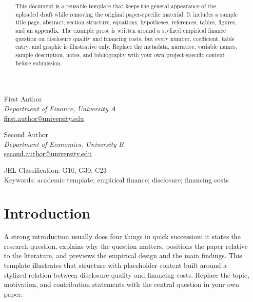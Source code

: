 \documentclass[hidelinks,12pt]{article}
\title{\bf \papertitle\\
\vspace*{-20pt}}
\author{}
\date{}
\makeatletter
\newcommand{\paperauthorone}{First Author}
\newcommand{\paperauthortwo}{Second Author}
\newcommand{\paperaffilone}{Department of Finance, University A}
\newcommand{\paperaffiltwo}{Department of Economics, University B}
\newcommand{\paperemailone}{first.author@university.edu}
\newcommand{\paperemailtwo}{second.author@university.edu}
\newif\ifblind
\makeatother
\begin{document}
\maketitle
\thispagestyle{empty}

\ifblind\else
\vspace{-1.5em}
\begin{center}
\paperauthorone\\
\textit{\paperaffilone}\\
\href{mailto:\paperemailone}{\paperemailone}
\vspace{0.7em}

\paperauthortwo\\
\textit{\paperaffiltwo}\\
\href{mailto:\paperemailtwo}{\paperemailtwo}
\end{center}
\vspace{1.0em}
\fi

\begin{abstract}
\vspace{0pt}
This document is a reusable template that keeps the general appearance of the uploaded draft while removing the original paper-specific material. It includes a sample title page, abstract, section structure, equations, hypotheses, references, tables, figures, and an appendix. The example prose is written around a stylized empirical finance question on disclosure quality and financing costs, but every number, coefficient, table entry, and graphic is illustrative only. Replace the metadata, narrative, variable names, sample description, notes, and bibliography with your own project-specific content before submission.
\end{abstract}


\vspace{32pt}
{\noindent JEL Classification: } G10, G30, C23\\
Keywords: academic template; empirical finance; disclosure; financing costs

\newpage
\setcounter{page}{1}

\section{Introduction}
\label{sec:intro}

A strong introduction usually does four things in quick succession: it states the research question, explains why the question matters, positions the paper relative to the literature, and previews the empirical design and the main findings. This template illustrates that structure with placeholder content built around a stylized relation between disclosure quality and financing costs. Replace the topic, motivation, and contribution statements with the central question in your own paper.
\end{document}
